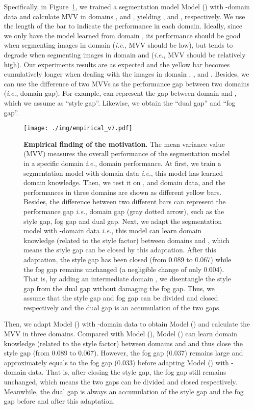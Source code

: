 \documentclass[10pt,twocolumn,letterpaper]{article}
\def\ie{\textit{i.e.}}
\begin{document}
Specifically, in Figure~\ref{fig:empirical}, we trained a segmentation model Model () with -domain data and calculate MVV in domains ,  and , yielding ,  and , respectively. We use the length of the bar to indicate the performance in each domain.
Ideally, since we only have the model learned from domain , its performance should be good when segmenting images in domain  (\ie, MVV should be low), but tends to degrade when segmenting images in domain  and  (\ie, MVV should be relatively high). Our experiments results are as expected and the yellow bar becomes cumulatively longer when dealing with the images in domain , , and . 
Besides, we can use the difference of two MVVs as the performance gap between two domains (\ie, domain gap). For example,  can represent the gap between domain  and , which we assume as ``style gap''. Likewise, we obtain the ``dual gap'' and ``fog gap''.


\begin{figure}[!tp]
    \centering
    \texttt{[image: ./img/empirical\_v7.pdf]}
    \caption{\textbf{Empirical finding of the motivation.} The mean variance value (MVV) measures the overall performance of the segmentation model in a specific domain \ie, domain performance.
    At first, we train a segmentation model with  domain data \ie, this model has learned  domain knowledge. Then, we test it on ,  and  domain data, and the performances in three domains are shown as different yellow bars. Besides, the difference between two different bars can represent the performance gap \ie, domain gap (gray dotted arrow), such as the style gap, fog gap and dual gap.
    Next, we adapt the segmentation model with -domain data \ie, this model can learn domain knowledge (related to the style factor) between domains  and , which means the style gap can be closed by this adaptation.
    After this adaptation, the style gap has been closed (from 0.089 to 0.067) while the fog gap remains unchanged (a negligible change of only 0.004). 
    That is, by adding an intermediate domain , we disentangle the style gap from the dual gap without damaging the fog gap.
    Thus, we assume that the style gap and fog gap can be divided and closed respectively and the dual gap is an accumulation of the two gaps.}
    \vspace{-4mm}
    \label{fig:empirical}
\end{figure}

Then, we adapt Model () with -domain data to obtain Model () and calculate the MVV in three domains. Compared with Model (), Model () can learn domain knowledge (related to the style factor) between domains  and  and thus close the style gap (from 0.089 to 0.067). However, the fog gap (0.037) remains large and approximately equals to the fog gap (0.033) before adapting Model () with -domain data. That is, after closing the style gap, the fog gap still remains unchanged, which means the two gaps can be divided and closed respectively. Meanwhile, the dual gap is always an accumulation of the style gap and the fog gap before and after this adaptation.
\end{document}
